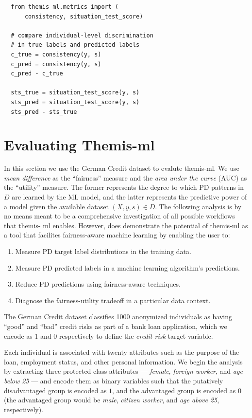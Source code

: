 \documentclass{{interact/interact}}
\begin{document}
\begin{verbatim}
  from themis_ml.metrics import (
      consistency, situation_test_score)

  # compare individual-level discrimination
  # in true labels and predicted labels
  c_true = consistency(y, s)
  c_pred = consistency(y, s)
  c_pred - c_true

  sts_true = situation_test_score(y, s)
  sts_pred = situation_test_score(y, s)
  sts_pred - sts_true
\end{verbatim}

\section{Evaluating Themis-ml}

In this section we use the German Credit dataset \cite{bache2013uci} to evalute
themis-ml. We use \emph{mean difference} as the ``fairness'' measure and the
\emph{area under the curve} (AUC) as the ``utility'' measure. The former
represents the degree to which PD patterns in \(D\) are learned by the ML model,
and the latter represents the predictive power of a model given the available
dataset \((X, y, s) \in D\). The following analysis is by no means meant to be a
comprehensive investigation of all possible workflows that themis- ml enables.
However, does demonstrate the potential of themis-ml as a tool that facilites
fairness-aware machine learning by enabling the user to:

\begin{enumerate}
  \item Measure PD target label distributions in the training data.
  \item Measure PD predicted labels in a machine learning algorithm's predictions.
  \item Reduce PD predictions using fairness-aware techniques.
  \item Diagnose the fairness-utility tradeoff in a particular data context.
\end{enumerate}

The German Credit dataset classifies 1000 anonymized individuals as having
``good'' and ``bad'' credit risks as part of a bank loan application, which we
encode as \(1\) and \(0\) respectively to define the \emph{credit risk}
target variable.

Each individual is associated with twenty attributes such as the purpose of the
loan, employment status, and other personal information. We begin the analysis
by extracting three protected class attributes --- \emph{female},
\emph{foreign worker}, and \emph{age below 25} --- and encode them as binary
variables such that the putatively disadvantaged group is encoded as \(1\), and
the advantaged group is encoded as \(0\) (the advantaged group would be
\emph{male}, \emph{citizen worker}, and \emph{age above 25}, respectively).
\end{document}
